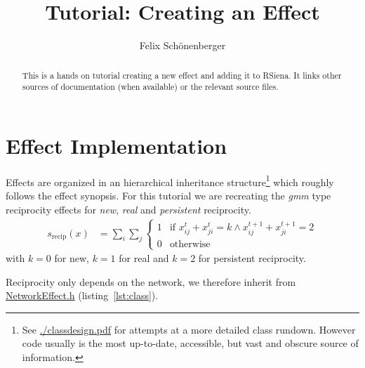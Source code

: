 \documentclass{tufte-handout}
\title{Tutorial: Creating an Effect}
\author{Felix Schönenberger}
\def\linkstyle{} %
\newcommand\sourcelinkpF[2]{\href{../#1/#2}{\linkstyle{#2}}}
\begin{document}
\maketitle

\begin{abstract}
This is a hands on tutorial creating a new effect and adding it to RSiena.
It links other sources of documentation (when available) or the relevant source files.
\end{abstract}

\section{Effect Implementation}

Effects are organized in an hierarchical inheritance structure\footnote{See \url{./classdesign.pdf} for attempts at a more detailed class rundown. However code usually is the most up-to-date, accessible, but vast and obscure source of information.} which roughly follows the effect synopsis.
For this tutorial we are recreating the \emph{gmm} type reciprocity effects for \emph{new}, \emph{real} and \emph{persistent} reciprocity.
\begin{align}\label{eq:def}
  s_{\text{recip}}(x) &= \sum_i \sum_j \left\{\begin{array}{ll}
     1 & \text{if } x^{t}_{ij}+x^{t}_{ji}=k \wedge x^{t+1}_{ij}+x^{t+1}_{ji}=2\\
     0 & \text{otherwise}
  \end{array}\right.
\end{align}
with $k=0$ for new, $k=1$ for real and $k=2$ for persistent reciprocity.

Reciprocity only depends on the network, we therefore inherit from \sourcelinkpF{src/model/effects}{NetworkEffect.h} (listing~\ref{lst:class}).
\end{document}
